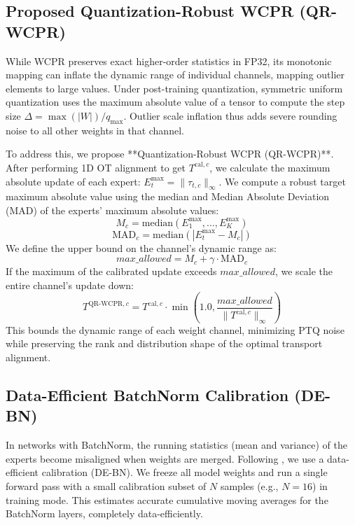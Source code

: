 \documentclass{article}
\theoremstyle{plain}
\theoremstyle{definition}
\theoremstyle{remark}
\begin{document}
\subsection{Proposed Quantization-Robust WCPR (QR-WCPR)}
While WCPR preserves exact higher-order statistics in FP32, its monotonic mapping can inflate the dynamic range of individual channels, mapping outlier elements to large values. Under post-training quantization, symmetric uniform quantization uses the maximum absolute value of a tensor to compute the step size $\Delta = \max(|W|) / q_{\text{max}}$. Outlier scale inflation thus adds severe rounding noise to all other weights in that channel.

To address this, we propose **Quantization-Robust WCPR (QR-WCPR)**. After performing 1D OT alignment to get $T^{\text{cal}, c}$, we calculate the maximum absolute update of each expert: $E^{\text{max}}_t = \| \tau_{t, c} \|_{\infty}$. We compute a robust target maximum absolute value using the median and Median Absolute Deviation (MAD) of the experts' maximum absolute values:
\begin{equation}
    M_c = \text{median}(E^{\text{max}}_1, \dots, E^{\text{max}}_K)
\end{equation}
\begin{equation}
    \text{MAD}_c = \text{median}(|E^{\text{max}}_t - M_c|)
\end{equation}
We define the upper bound on the channel's dynamic range as:
\begin{equation}
    max\_allowed = M_c + \gamma \cdot \text{MAD}_c
\end{equation}
If the maximum of the calibrated update exceeds $max\_allowed$, we scale the entire channel's update down:
\begin{equation}
    T^{\text{QR-WCPR}, c} = T^{\text{cal}, c} \cdot \min\left(1.0, \frac{max\_allowed}{\| T^{\text{cal}, c} \|_{\infty}}\right)
\end{equation}
This bounds the dynamic range of each weight channel, minimizing PTQ noise while preserving the rank and distribution shape of the optimal transport alignment.

\subsection{Data-Efficient BatchNorm Calibration (DE-BN)}
In networks with BatchNorm, the running statistics (mean and variance) of the experts become misaligned when weights are merged. Following \cite{methodologist2026}, we use a data-efficient calibration (DE-BN). We freeze all model weights and run a single forward pass with a small calibration subset of $N$ samples (e.g., $N=16$) in training mode. This estimates accurate cumulative moving averages for the BatchNorm layers, completely data-efficiently.
\end{document}
